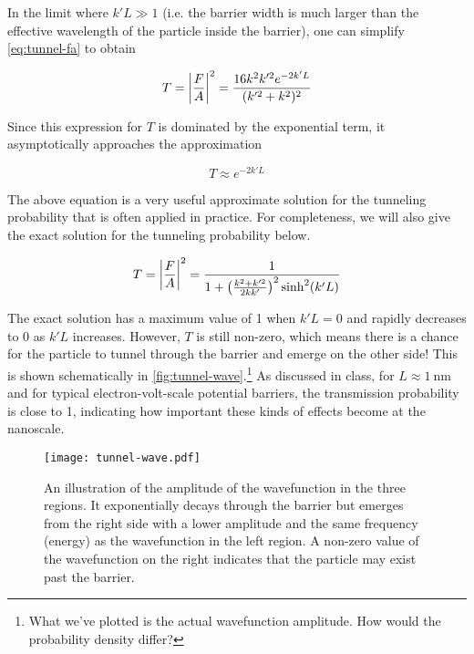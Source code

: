 In the limit where $k'L \gg 1$ (i.e. the barrier width is much larger than the effective wavelength of the particle inside the barrier), one can simplify \autoref{eq:tunnel-fa} to obtain

\begin{equation}
	T = \abs{\frac{F}{A}}^2 = \frac{16k^2k^{\prime 2}e^{-2k'L}}{(k^{\prime 2}+k^2)^2} \label{eq:tunnel-prob}
\end{equation}

Since this expression for $T$ is dominated by the exponential term, it asymptotically approaches the approximation

\begin{tcolorbox}[title = Tunneling probability approximation when $E < V_0$] \vspace{-2ex}
	\begin{equation}
		T \approx e^{-2k'L} \label{eq:tunnel-approx}
	\end{equation}
\end{tcolorbox}

The above equation is a very useful approximate solution for the tunneling probability that is often applied in practice. 
For completeness, we will also give the exact solution for the tunneling probability below.

\begin{tcolorbox}[title = Tunneling probability exact solution when $E < V_0$] \vspace{-2ex}
	\begin{equation}
		T = \abs{\frac{F}{A}}^2 = \frac{1}{1 + \left(\frac{k^2+k^{\prime 2}}{2kk'}\right)^2 \sinh^2(k'L)} \label{eq:tunnel-prob-full}
	\end{equation}
\end{tcolorbox}

The exact solution has a maximum value of 1 when $k'L = 0$ and rapidly decreases to 0 as $k'L$ increases. 
However, $T$ is still non-zero, which means there is a chance for the particle to tunnel through the barrier and emerge on the other side! 
This is shown schematically in \autoref{fig:tunnel-wave}.\footnote{What we've plotted is the actual wavefunction amplitude. How would the probability density differ?} 
As discussed in class, for $L \approx \SI{1}{\nano\meter}$ and for typical electron-volt-scale potential barriers, the transmission probability is close to 1, indicating how important these kinds of effects become at the nanoscale.

\begin{figure}[!h]
	\centering
	\texttt{[image: tunnel-wave.pdf]}
	\caption{An illustration of the amplitude of the wavefunction in the three regions. 
	It exponentially decays through the barrier but emerges from the right side with a lower amplitude and the same frequency (energy) as the wavefunction in the left region. 
	A non-zero value of the wavefunction on the right indicates that the particle may exist past the barrier.}
	\label{fig:tunnel-wave}
\end{figure}

